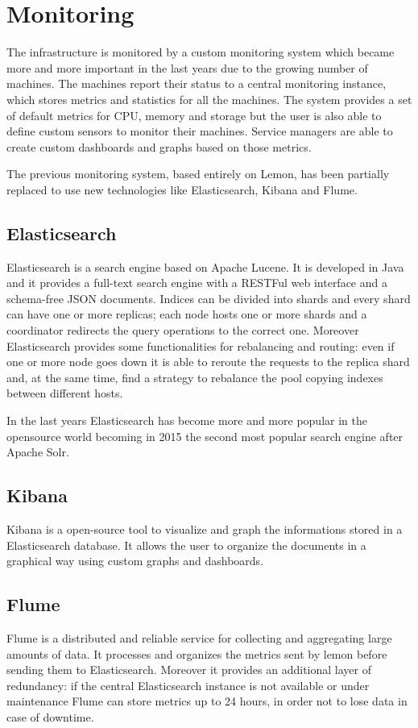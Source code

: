 \section{Monitoring}

The infrastructure is monitored by a custom monitoring system which became
more and more important in the last years due to the growing number of
machines. The machines report their status to a central monitoring
instance, which stores metrics and statistics for all the machines. The
system provides a set of default metrics for CPU, memory and storage but
the user is also able to define custom sensors to monitor their machines.
Service managers are able to create custom dashboards and graphs based on
those metrics.

The previous monitoring system, based entirely on Lemon, has been
partially replaced to use new technologies like Elasticsearch, Kibana and
Flume. 

\subsection{Elasticsearch}

Elasticsearch is a search engine based on Apache Lucene. It is developed
in Java and it provides a full-text search engine with a RESTFul web
interface and a schema-free JSON documents. Indices can be divided into
shards and every shard can have one or more replicas; each node hosts one
or more shards and a coordinator redirects the query operations to the
correct one. Moreover Elasticsearch provides some functionalities for
rebalancing and routing: even if one or more node goes down it is able to
reroute the requests to the replica shard and, at the same time, find
a strategy to rebalance the pool copying indexes between different
hosts.

In the last years Elasticsearch has become more and more popular in the
opensource world becoming in 2015 the second most popular search engine
after Apache Solr.


\subsection{Kibana}

Kibana is a open-source tool to visualize and graph the informations
stored in a Elasticsearch database. It allows the user to organize the
documents in a graphical way using custom graphs and dashboards. 


\subsection{Flume}

Flume is a distributed and reliable service for collecting and aggregating
large amounts of data. It processes and organizes the metrics sent by
lemon before sending them to Elasticsearch. Moreover it provides an
additional layer of redundancy: if the central Elasticsearch instance is
not available or under maintenance Flume can store metrics up to 24 hours,
in order not to lose data in case of downtime.

